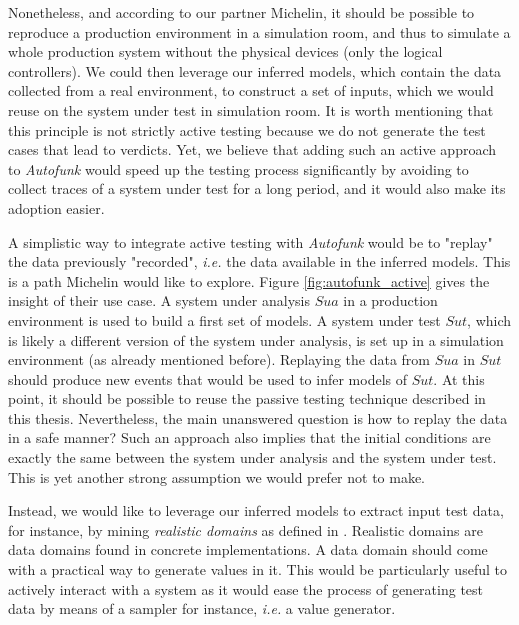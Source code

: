 Nonetheless, and according to our partner Michelin, it
should be possible to reproduce a production environment in a
simulation room, and thus to simulate a whole production system
without the physical devices (only the logical controllers). We
could then leverage our inferred models, which contain the data
collected from a real environment, to construct a set of inputs,
which we would reuse on the system under test in simulation room.
It is worth mentioning that this principle is not strictly active
testing because we do not generate the test cases that lead to
verdicts.  Yet, we believe that adding such an active approach to
\textit{Autofunk} would speed up the testing process
significantly by avoiding to collect traces of a system under
test for a long period, and it would also make its adoption
easier.

A simplistic way to integrate active testing with \emph{Autofunk}
would be to "replay"
\cite{thane2000using,Orso:2005:SCR:1082983.1083251} the data
previously "recorded", \emph{i.e.} the data available in the
inferred models. This is a path Michelin would like to explore.
Figure \ref{fig:autofunk_active} gives the insight of their use
case. A system under analysis $\mathit{Sua}$ in a production
environment is used to build a first set of models. A system
under test $\mathit{Sut}$, which is likely a different version of
the system under analysis, is set up in a simulation environment
(as already mentioned before).  Replaying the data from
$\mathit{Sua}$ in $\mathit{Sut}$ should produce new events that
would be used to infer models of $\mathit{Sut}$.  At this point,
it should be possible to reuse the passive testing technique
described in this thesis.  Nevertheless, the main unanswered
question is how to replay the data in a safe manner?  Such an
approach also implies that the initial conditions are exactly the
same between the system under analysis and the system under test.
This is yet another strong assumption we would prefer not to
make.

Instead, we would like to leverage our inferred models to extract
input test data, for instance, by mining \emph{realistic domains}
as defined in \cite{Enderlin:2011:PSL:2075545.2075551}. Realistic
domains are data domains found in concrete implementations. A
data domain should come with a practical way to generate values
in it. This would be particularly useful to actively interact
with a system as it would ease the process of generating test
data by means of a sampler for instance, \emph{i.e.} a value
generator.

